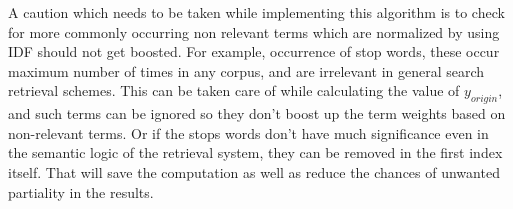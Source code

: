 A caution which needs to be taken while implementing this algorithm is to check for more commonly occurring non relevant terms which are normalized by using IDF should not get boosted. For example, occurrence of stop words, these occur maximum number of times in any corpus, and are irrelevant in general search retrieval schemes. This can be taken care of while calculating the value of $y_{origin}$, and such terms can be ignored so they don’t boost up the term weights based on non-relevant terms. Or if the stops words don't have much significance even in the semantic logic of the retrieval system, they can be removed in the first index itself. That will save the computation as well as reduce the chances of unwanted partiality in the results.
